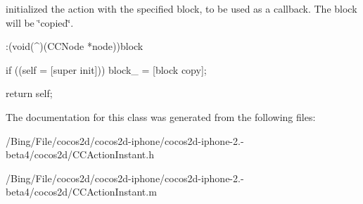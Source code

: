 initialized the action with the specified block, to be used as a callback. The block will be \char`\"{}copied\char`\"{}. 
\begin{DoxyCode}
                   :(void(^)(CCNode *node))block
{
        if ((self = [super init]))
                block_ = [block copy];

        return self;
}
\end{DoxyCode}


The documentation for this class was generated from the following files\-:\begin{DoxyCompactItemize}
\item 
/\-Bing/\-File/cocos2d/cocos2d-\/iphone/cocos2d-\/iphone-\/2.-\/beta4/cocos2d/C\-C\-Action\-Instant.\-h\item 
/\-Bing/\-File/cocos2d/cocos2d-\/iphone/cocos2d-\/iphone-\/2.-\/beta4/cocos2d/C\-C\-Action\-Instant.\-m\end{DoxyCompactItemize}
